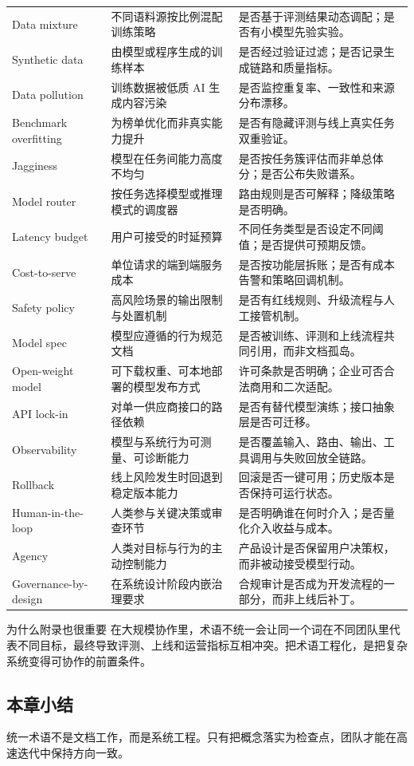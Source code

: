 \begin{longtable}{p{}p{}p{}}
Data mixture & 不同语料源按比例混配训练策略 & 是否基于评测结果动态调配；是否有小模型先验实验。 \\
Synthetic data & 由模型或程序生成的训练样本 & 是否经过验证过滤；是否记录生成链路和质量指标。 \\
Data pollution & 训练数据被低质 AI 生成内容污染 & 是否监控重复率、一致性和来源分布漂移。 \\
Benchmark overfitting & 为榜单优化而非真实能力提升 & 是否有隐藏评测与线上真实任务双重验证。 \\
Jagginess & 模型在任务间能力高度不均匀 & 是否按任务簇评估而非单总体分；是否公布失败谱系。 \\
Model router & 按任务选择模型或推理模式的调度器 & 路由规则是否可解释；降级策略是否明确。 \\
Latency budget & 用户可接受的时延预算 & 不同任务类型是否设定不同阈值；是否提供可预期反馈。 \\
Cost-to-serve & 单位请求的端到端服务成本 & 是否按功能层拆账；是否有成本告警和策略回调机制。 \\
Safety policy & 高风险场景的输出限制与处置机制 & 是否有红线规则、升级流程与人工接管机制。 \\
Model spec & 模型应遵循的行为规范文档 & 是否被训练、评测和上线流程共同引用，而非文档孤岛。 \\
Open-weight model & 可下载权重、可本地部署的模型发布方式 & 许可条款是否明确；企业可否合法商用和二次适配。 \\
API lock-in & 对单一供应商接口的路径依赖 & 是否有替代模型演练；接口抽象层是否可迁移。 \\
Observability & 模型与系统行为可测量、可诊断能力 & 是否覆盖输入、路由、输出、工具调用与失败回放全链路。 \\
Rollback & 线上风险发生时回退到稳定版本能力 & 回滚是否一键可用；历史版本是否保持可运行状态。 \\
Human-in-the-loop & 人类参与关键决策或审查环节 & 是否明确谁在何时介入；是否量化介入收益与成本。 \\
Agency & 人类对目标与行为的主动控制能力 & 产品设计是否保留用户决策权，而非被动接受模型行动。 \\
Governance-by-design & 在系统设计阶段内嵌治理要求 & 合规审计是否成为开发流程的一部分，而非上线后补丁。 \\
\bottomrule
\end{longtable}

\begin{knowledgebox}{为什么附录也很重要}
在大规模协作里，术语不统一会让同一个词在不同团队里代表不同目标，最终导致评测、上线和运营指标互相冲突。把术语工程化，是把复杂系统变得可协作的前置条件。
\end{knowledgebox}

\subsection{本章小结}

统一术语不是文档工作，而是系统工程。只有把概念落实为检查点，团队才能在高速迭代中保持方向一致。

